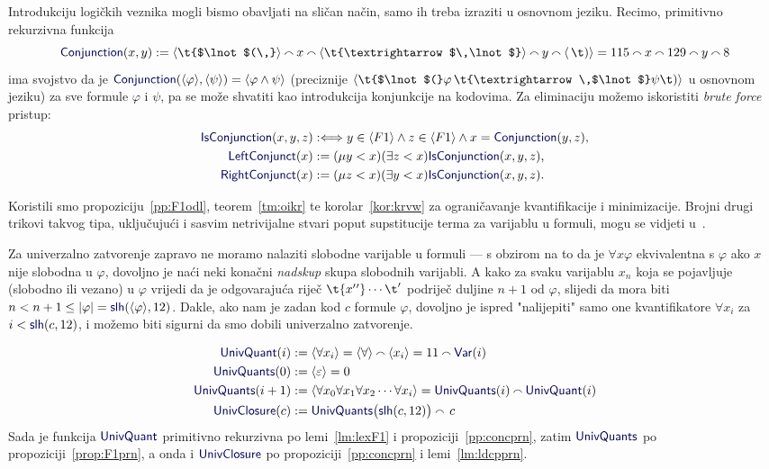 Introdukciju logičkih veznika mogli bismo obavljati na sličan način, samo ih treba izraziti u osnovnom jeziku. Recimo, primitivno rekurzivna funkcija
\begin{equation}\label{eq:Conjunction}
    \f{Conjunction}(x,y):=
    \kr{\t{$\lnot$(\,}}\conc{}
    x\conc{}
    \kr{\t{\textrightarrow$\,\lnot$}}\conc{}
    y\conc{}
    \kr{\,\t)}=
    115\conc{}
    x\conc{}
    129\conc{}
    y\conc{}
    8
\end{equation}
ima svojstvo da je $\f{Conjunction}(\kr{\varphi},\kr{\psi})=\kr{\varphi\land\psi}$ (preciznije $\kr{\t{$\lnot$(}\varphi\,\t{\textrightarrow\,$\lnot$}\psi\t)}$ u osnovnom jeziku) za sve formule $\varphi$ i $\psi$, pa se može shvatiti kao introdukcija konjunkcije na kodovima. Za eliminaciju možemo iskoristiti \emph{brute force} pristup:
\begin{align}
    \f{IsConjunction}(x,y,z)&:\Longleftrightarrow y\in\kr{F1}\land z\in\kr{F1}\land x=\f{Conjunction}(y,z)\text,
\\\label{eq:lconj}
    \f{LeftConjunct}(x)&:=(\mu y<x)(\exists z<x)\f{IsConjunction}(x,y,z)\text,
\\\label{eq:rconj}
    \f{RightConjunct}(x)&:=(\mu z<x)(\exists y<x)\f{IsConjunction}(x,y,z)\text.
\end{align}

Koristili smo propoziciju~\ref{pp:F1odl}, teorem~\ref{tm:oikr} te korolar~\ref{kor:krvw} za ograničavanje kvantifikacije i minimizacije. Brojni drugi trikovi takvog tipa, uključujući i sasvim netrivijalne stvari poput supstitucije terma za varijablu u formuli, mogu se vidjeti u~\cite{smullyan}.

Za univerzalno zatvorenje zapravo ne moramo nalaziti slobodne varijable u formuli --- s obzirom na to da je $\forall x\varphi$ ekvivalentna s $\varphi$ ako $x$ nije slobodna u $\varphi$, dovoljno je naći neki konačni \emph{nadskup} skupa slobodnih varijabli. A kako za svaku varijablu $x_n$ koja se pojavljuje (slobodno ili vezano) u $\varphi$ vrijedi da je odgovarajuća riječ $\t{x{}'{}'}\dotsm\t'$ podriječ duljine $n+1$ od $\varphi$, slijedi da mora biti $n<n+1\le\dulj\varphi=\f{slh}(\kr{\varphi},12)$. Dakle, ako nam je zadan kod $c$ formule $\varphi$, dovoljno je ispred "nalijepiti" samo one kvantifikatore $\forall x_i$ za $i<\f{slh}(c,12)$, i možemo biti sigurni da smo dobili univerzalno zatvorenje.

\noindent\begin{align}
    \f{UnivQuant}(i)&:=\kr{\forall x_i}=\kr{\forall}\conc{}\kr{x_i}=11\conc{}\f{Var}(i)\\
    \f{UnivQuants}(0)&:=\kr{\varepsilon}=0\\
    \f{UnivQuants}(i+1)&:=\kr{\forall x_0\forall x_1\forall x_2\dotsm\forall x_i}=\f{UnivQuants}(i)\conc{}\f{UnivQuant}(i)\\
    \f{UnivClosure}(c)&:=\f{UnivQuants}\bigl(\f{slh}(c,12)\bigr)\conc{}\,c
\end{align}
Sada je funkcija $\f{UnivQuant}$ primitivno rekurzivna po lemi~\ref{lm:lexF1} i propoziciji~\ref{pp:concprn}, zatim $\f{UnivQuants}$ po propoziciji~\ref{prop:F1prn}, a onda i $\f{UnivClosure}$ po propoziciji~\ref{pp:concprn} i lemi~\ref{lm:ldcpprn}.

